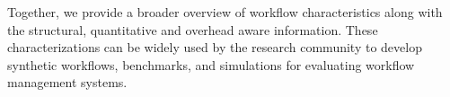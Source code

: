 Together, we provide a broader overview of workflow characteristics along with the structural, quantitative and overhead aware information. These characterizations can be widely used by the research community to develop synthetic workflows, benchmarks, and simulations for evaluating workflow management systems. 







